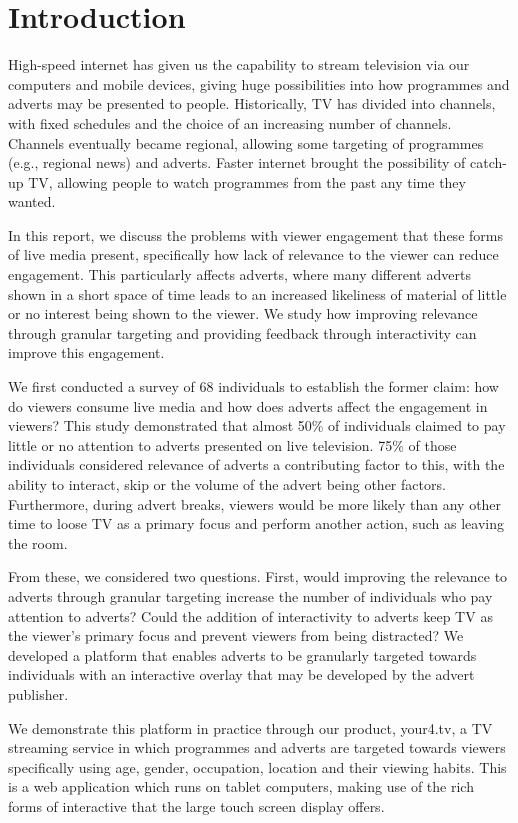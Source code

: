 \section{Introduction}
High-speed internet has given us the capability to stream television via our computers and mobile devices, giving huge possibilities into how programmes and adverts may be presented to people. Historically, TV has divided into channels, with fixed schedules and the choice of an increasing number of channels. Channels eventually became regional, allowing some targeting of programmes (e.g., regional news) and adverts. Faster internet brought the possibility of catch-up TV, allowing people to watch programmes from the past any time they wanted.

In this report, we discuss the problems with viewer engagement that these forms of live media present, specifically how lack of relevance to the viewer can reduce engagement. This particularly affects adverts, where many different adverts shown in a short space of time leads to an increased likeliness of material of little or no interest being shown to the viewer. We study how improving relevance through granular targeting and providing feedback through interactivity can improve this engagement.

We first conducted a survey of 68 individuals to establish the former claim: how do viewers consume live media and how does adverts affect the engagement in viewers? This study demonstrated that almost 50\% of individuals claimed to pay little or no attention to adverts presented on live television. 75\% of those individuals considered relevance of adverts a contributing factor to this, with the ability to interact, skip or the volume of the advert being other factors. Furthermore, during advert breaks, viewers would be more likely than any other time to loose TV as a primary focus and perform another action, such as leaving the room.

From these, we considered two questions. First, would improving the relevance to adverts through granular targeting increase the number of individuals who pay attention to adverts? Could the addition of interactivity to adverts keep TV as the viewer's primary focus and prevent viewers from being distracted? We developed a platform that enables adverts to be granularly targeted towards individuals with an interactive overlay that may be developed by the advert publisher. 

We demonstrate this platform in practice through our product, your4.tv, a TV streaming service in which programmes and adverts are targeted towards viewers specifically using age, gender, occupation, location and their viewing habits. This is a web application which runs on tablet computers, making use of the rich forms of interactive that the large touch screen display offers.

